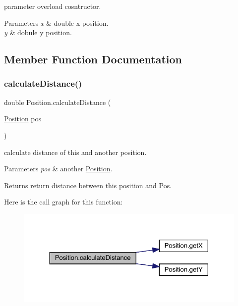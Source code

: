 parameter overload cosntructor. 
\begin{DoxyParams}{Parameters}
{\em x} & double x position. \\
\hline
{\em y} & dobule y position. \\
\hline
\end{DoxyParams}


\subsection{Member Function Documentation}
\mbox{\label{class_position_a300868e5df600558c34027a8619ba28b}} 
\subsubsection{\texorpdfstring{calculate\+Distance()}{calculateDistance()}}
{\footnotesize\ttfamily double Position.\+calculate\+Distance (\begin{DoxyParamCaption}\item[{\mbox{\hyperlink{class_position}{Position}}}]{pos }\end{DoxyParamCaption})\hspace{0.3cm}{\ttfamily [inline]}}

calculate distance of this and another position. 
\begin{DoxyParams}{Parameters}
{\em pos} & another \mbox{\hyperlink{class_position}{Position}}. \\
\hline
\end{DoxyParams}
\begin{DoxyReturn}{Returns}
return distance between this position and Pos. 
\end{DoxyReturn}
Here is the call graph for this function\+:
\nopagebreak
\begin{figure}[H]
\begin{center}
\leavevmode
\includegraphics[width=324pt]{class_position_a300868e5df600558c34027a8619ba28b_cgraph}
\end{center}
\end{figure}
\mbox{\label{class_position_a14c74938fcd12f380e0f3d19cfc8fb70}} 
